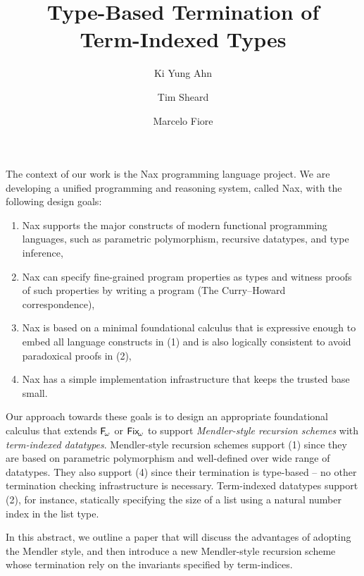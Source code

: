 \documentclass[a4paper]{easychair} %
\title{Type-Based Termination of\\ Term-Indexed Types}
\author{
Ki Yung Ahn\inst{1}
\and
Tim Sheard\inst{1}
 \and
Marcelo Fiore\inst{2}
}
\institute{
  Portland State University~\thanks{supported by NSF grant 0910500.}
\and
  University of Cambridge
}
\newcommand{\Fw}[0]{{\ensuremath{\mathsf{\uppercase{F}}_{\!\omega}}}}
\newcommand{\Fixw}[0]{{\ensuremath{\mathsf{\uppercase{F}\lowercase{ix}}_{\!\omega}}}}
\begin{document}
\maketitle


The context of our work is the Nax programming language project.
We are developing a unified programming and reasoning system,
called Nax, with the following design goals:\vspace*{-1ex}
\begin{enumerate}[(1)]
 \item Nax supports the major constructs of modern functional programming languages,
 such as parametric polymorphism, recursive datatypes, and type inference,
 \vspace*{-1.2ex}
 \item Nax can specify fine-grained program properties as types and
 witness proofs of such properties by writing a program (The Curry--Howard correspondence),
 \vspace*{-1.2ex}
 \item Nax is based on a minimal foundational calculus
 that is expressive enough to embed all language constructs in (1)
 and is also logically consistent to avoid paradoxical proofs in (2),\vspace*{-1.2ex}
 \item Nax has a simple implementation infrastructure that keeps the trusted base small.
\end{enumerate}
\vspace*{-.5ex}
Our approach towards these goals is to 
design an appropriate foundational calculus
that extends \Fw \cite{Girard72} or \Fixw \cite{AbeMat04} to support
\emph{Mendler-style recursion schemes} \cite{Mendler87} with \emph{term-indexed datatypes}.
Mendler-style recursion schemes support (1) since they are based
on parametric polymorphism and well-defined over wide range of datatypes.
They also support (4) since their termination is type-based --
no other termination checking infrastructure is necessary.
Term-indexed datatypes support (2), for instance,
statically specifying the size of a list using a natural number index in the list type.

In this abstract, we outline a paper
that will discuss the advantages of adopting the Mendler style,
and then introduce a new Mendler-style recursion scheme whose
termination rely on the invariants specified by term-indices.
\vspace*{-1ex}
\end{document}
